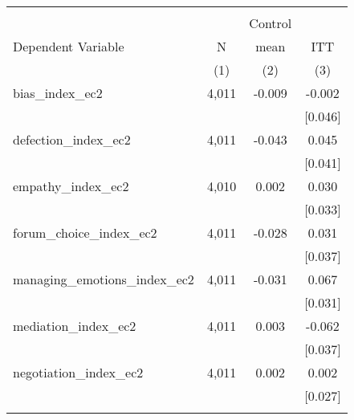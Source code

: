 \begin{tabular}{lccc}
\hline \noalign{\smallskip} &  &  & \\
 &  & Control & \\
Dependent Variable & N & mean & ITT\\
 & (1) & (2) & (3)\\
\noalign{\smallskip}\hline \noalign{\smallskip}bias_index_ec2 & 4,011 & -0.009 & -0.002\\
 &  &  & [0.046]\\
defection_index_ec2 & 4,011 & -0.043 & 0.045\\
 &  &  & [0.041]\\
empathy_index_ec2 & 4,010 & 0.002 & 0.030\\
 &  &  & [0.033]\\
forum_choice_index_ec2 & 4,011 & -0.028 & 0.031\\
 &  &  & [0.037]\\
managing_emotions_index_ec2 & 4,011 & -0.031 & 0.067\\
 &  &  & [0.031]\\
mediation_index_ec2 & 4,011 & 0.003 & -0.062\\
 &  &  & [0.037]\\
negotiation_index_ec2 & 4,011 & 0.002 & 0.002\\
 &  &  & [0.027]\\
\noalign{\smallskip}\hline\end{tabular}
